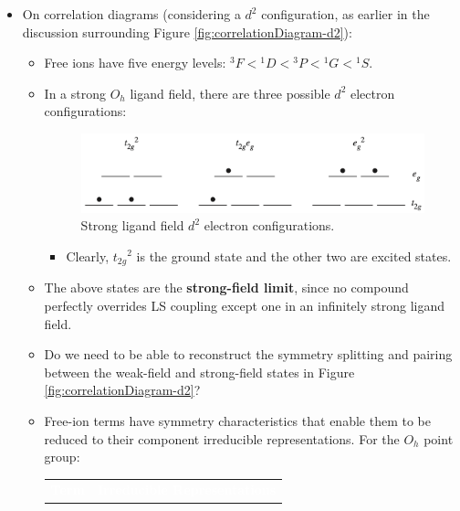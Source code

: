 \documentclass[../notes.tex]{subfiles}
\begin{document}
\begin{itemize}
    \item On correlation diagrams (considering a $d^2$ configuration, as earlier in the discussion surrounding Figure \ref{fig:correlationDiagram-d2}):
    \begin{itemize}
        \item Free ions have five energy levels: ${}^3F<{}^1D<{}^3P<{}^1G<{}^1S$.
        \item In a strong $O_h$ ligand field, there are three possible $d^2$ electron configurations:
        \begin{figure}[h!]
            \centering
            \includegraphics[width=0.6\linewidth]{../ExtFiles/strongFieldConfigs-d2.png}
            \caption{Strong ligand field $d^2$ electron configurations.}
            \label{fig:strongFieldConfigs-d2}
        \end{figure}
        \begin{itemize}
            \item Clearly, ${t_{2g}}^2$ is the ground state and the other two are excited states.
        \end{itemize}
        \item The above states are the \textbf{strong-field limit}, since no compound perfectly overrides LS coupling except one in an infinitely strong ligand field.
        \item Do we need to be able to reconstruct the symmetry splitting and pairing between the weak-field and strong-field states in Figure \ref{fig:correlationDiagram-d2}?
        \item Free-ion terms have symmetry characteristics that enable them to be reduced to their component irreducible representations. For the $O_h$ point group:
        \begin{table}[h!]
            \centering
            \small
            \renewcommand{\arraystretch}{1.4}
            \begin{tabular}{ll}
                \rowcolor{grx}
                \textcolor{white}{\textbf{Term}} & \textcolor{white}{\textbf{Irreducible Representations}}\\


\end{tabular}
\end{table}
\end{itemize}
\end{itemize}
\end{document}
